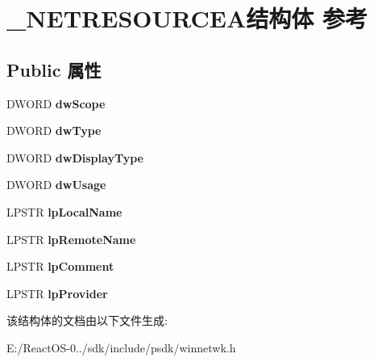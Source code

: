\hypertarget{struct___n_e_t_r_e_s_o_u_r_c_e_a}{}\section{\+\_\+\+N\+E\+T\+R\+E\+S\+O\+U\+R\+C\+E\+A结构体 参考}
\label{struct___n_e_t_r_e_s_o_u_r_c_e_a}
\subsection*{Public 属性}
\begin{DoxyCompactItemize}
\item 
\mbox{\label{struct___n_e_t_r_e_s_o_u_r_c_e_a_a55ca71085f780faf9004e63c5df86faa}} 
D\+W\+O\+RD {\bfseries dw\+Scope}
\item 
\mbox{\label{struct___n_e_t_r_e_s_o_u_r_c_e_a_afcef0e32504335cde5a3c1613122c1c7}} 
D\+W\+O\+RD {\bfseries dw\+Type}
\item 
\mbox{\label{struct___n_e_t_r_e_s_o_u_r_c_e_a_a250a14210680f40566679b4e90c6b6b7}} 
D\+W\+O\+RD {\bfseries dw\+Display\+Type}
\item 
\mbox{\label{struct___n_e_t_r_e_s_o_u_r_c_e_a_af67a00bd09dd2409202c921cf0e5528c}} 
D\+W\+O\+RD {\bfseries dw\+Usage}
\item 
\mbox{\label{struct___n_e_t_r_e_s_o_u_r_c_e_a_a049af38480b64183d5dee92d2811d5a8}} 
L\+P\+S\+TR {\bfseries lp\+Local\+Name}
\item 
\mbox{\label{struct___n_e_t_r_e_s_o_u_r_c_e_a_ab11a0d204af92bcc50d21b604eee184b}} 
L\+P\+S\+TR {\bfseries lp\+Remote\+Name}
\item 
\mbox{\label{struct___n_e_t_r_e_s_o_u_r_c_e_a_a4a0c69548acd253bba44798bf77d1971}} 
L\+P\+S\+TR {\bfseries lp\+Comment}
\item 
\mbox{\label{struct___n_e_t_r_e_s_o_u_r_c_e_a_a6549d9ae41ca609ae22f11197ae4cc8c}} 
L\+P\+S\+TR {\bfseries lp\+Provider}
\end{DoxyCompactItemize}


该结构体的文档由以下文件生成\+:\begin{DoxyCompactItemize}
\item 
E\+:/\+React\+O\+S-\/0../sdk/include/psdk/winnetwk.\+h\end{DoxyCompactItemize}
